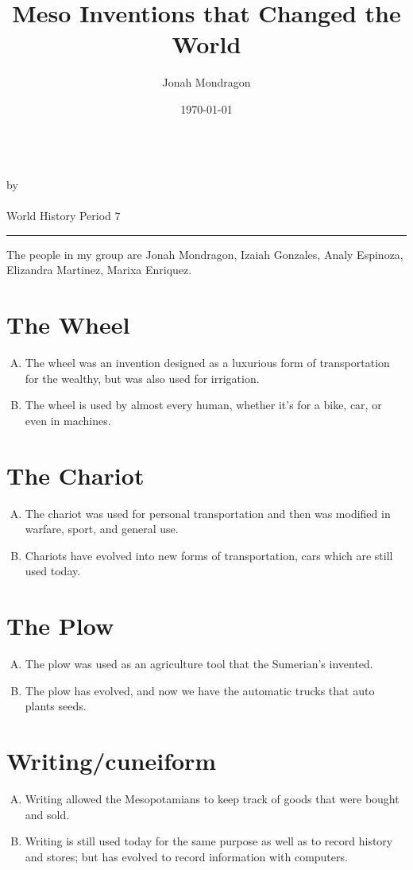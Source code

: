 \documentclass[12pt]{article}
\newcommand{\PutTitle}[1]
{
    \begin{center}
        {\huge\bfseries\thetitle}\\
        by \theauthor\\
        \thedate\\
        #1        
    \end{center}
    \hrule
    \vspace{2ex}
}
\begin{document}
\title{Meso Inventions that Changed the World}
\author{Jonah Mondragon}
\date{\today}
\PutTitle{World History Period 7}

\doublespacing

The people in my group are Jonah Mondragon, Izaiah Gonzales, Analy Espinoza,
Elizandra Martinez, Marixa Enriquez.

\section{The Wheel}
    \begin{enumerate}[A.]
        \item{The wheel was an invention designed as a luxurious form of
            transportation for the wealthy, but was also used for irrigation.}
        \item{The wheel is used by almost every human, whether it's for a bike,
            car, or even in machines.}
    \end{enumerate}

\section{The Chariot}
    \begin{enumerate}[A.]
        \item{The chariot was used for personal transportation and then was
            modified in warfare, sport, and general use.}
        \item{Chariots have evolved into new forms of transportation, cars
            which are still used today.}
    \end{enumerate}

\section{The Plow}
    \begin{enumerate}[A.]
        \item{The plow was used as an agriculture tool that the Sumerian's
            invented.}
        \item{The plow has evolved, and now we have the automatic trucks that
            auto plants seeds.}
    \end{enumerate}

\section{Writing/cuneiform}
\begin{enumerate}[A.] 
    \item{Writing allowed the Mesopotamians to keep track of goods that were
        bought and sold.}
    \item{Writing is still used today for the same purpose as well as to record
        history and stores; but has evolved to record information with
        computers.}
\end{enumerate}
\end{document}
